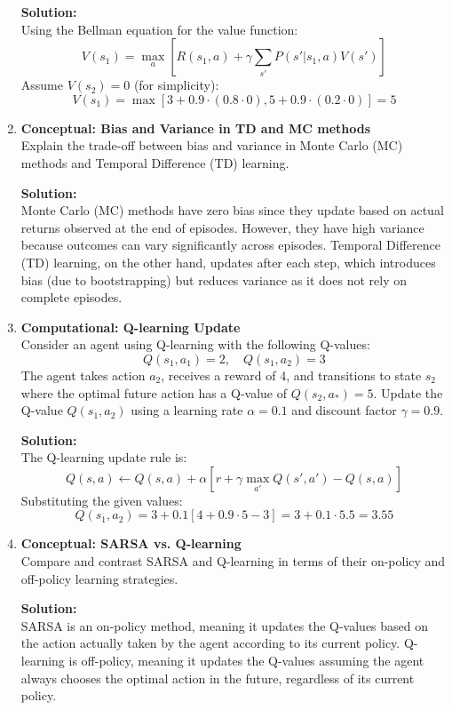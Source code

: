 \documentclass{article}
\begin{document}
\begin{enumerate}[label=Q\arabic*.]
\textbf{Solution:} \\
Using the Bellman equation for the value function:
\[
V(s_1) = \max_{a} \left[ R(s_1, a) + \gamma \sum_{s'} P(s'|s_1, a) V(s') \right]
\]
Assume $V(s_2) = 0$ (for simplicity):
\[
V(s_1) = \max \left[ 3 + 0.9 \cdot (0.8 \cdot 0), 5 + 0.9 \cdot (0.2 \cdot 0) \right] = 5
\]

\item \textbf{Conceptual: Bias and Variance in TD and MC methods} \\
Explain the trade-off between bias and variance in Monte Carlo (MC) methods and Temporal Difference (TD) learning. 

\textbf{Solution:} \\
Monte Carlo (MC) methods have zero bias since they update based on actual returns observed at the end of episodes. However, they have high variance because outcomes can vary significantly across episodes. Temporal Difference (TD) learning, on the other hand, updates after each step, which introduces bias (due to bootstrapping) but reduces variance as it does not rely on complete episodes.

\item \textbf{Computational: Q-learning Update} \\
Consider an agent using Q-learning with the following Q-values:
\[
Q(s_1, a_1) = 2, \quad Q(s_1, a_2) = 3
\]
The agent takes action $a_2$, receives a reward of 4, and transitions to state $s_2$ where the optimal future action has a Q-value of $Q(s_2, a_*) = 5$. Update the Q-value $Q(s_1, a_2)$ using a learning rate $\alpha = 0.1$ and discount factor $\gamma = 0.9$.

\textbf{Solution:} \\
The Q-learning update rule is:
\[
Q(s, a) \leftarrow Q(s, a) + \alpha \left[ r + \gamma \max_{a'} Q(s', a') - Q(s, a) \right]
\]
Substituting the given values:
\[
Q(s_1, a_2) = 3 + 0.1 \left[ 4 + 0.9 \cdot 5 - 3 \right] = 3 + 0.1 \cdot 5.5 = 3.55
\]

\item \textbf{Conceptual: SARSA vs. Q-learning} \\
Compare and contrast SARSA and Q-learning in terms of their on-policy and off-policy learning strategies.

\textbf{Solution:} \\
SARSA is an on-policy method, meaning it updates the Q-values based on the action actually taken by the agent according to its current policy. Q-learning is off-policy, meaning it updates the Q-values assuming the agent always chooses the optimal action in the future, regardless of its current policy.


\end{enumerate}
\end{document}
